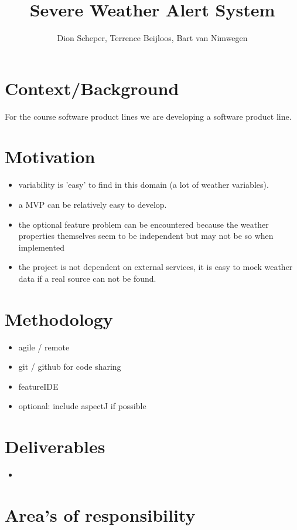\documentclass[]{article}
\title{Severe Weather Alert System}
\author{Dion Scheper, Terrence Beijloos, Bart van Nimwegen}
\begin{document}
\maketitle

\section{Context/Background}
For the course software product lines we are developing a software product line. 

\section{Motivation}
\begin{itemize}
	\item variability is 'easy' to find in this domain (a lot of weather variables).
	\item a MVP can be relatively easy to develop.
	\item the optional feature problem can be encountered because the weather properties themselves seem to be independent but may not be so when implemented
	\item the project is not dependent on external services, it is easy to mock weather data if a real source can not be found.
\end{itemize}

\section{Methodology}
\begin{itemize}
	\item agile / remote
	\item git / github for code sharing
	\item featureIDE
	\item optional: include aspectJ if possible
\end{itemize}

\section{Deliverables}
\begin{itemize}
	\item 
\end{itemize}


\section{Area's of responsibility}
\end{document}

